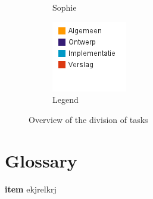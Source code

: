 \documentclass[i3]{oss}
\newcommand{\gloss}[1]{\textbf{#1}}
\begin{document}
\begin{figure}[h!]
\begin{subfigure}[hb]{0.20\textwidth}
                \caption{Sophie}
        \end{subfigure}%
                \begin{subfigure}[hb]{0.20\textwidth}
                \centering
                \includegraphics[width=\textwidth]{legende}
                \caption{Legend}
        \end{subfigure}%


 \caption{Overview of the division of tasks}
\label{fig:werkverdeling}
\end{figure}

\section{Glossary}
\label{ssec:glossary}
\begin{description}

\item \gloss{item}
ekjrelkrj

\end{description}
 
\end{document}

